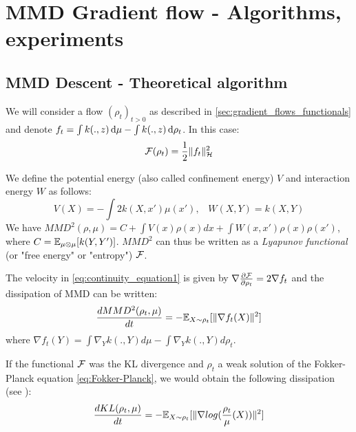 \section{MMD Gradient flow - Algorithms, experiments}\label{sec:mmd_flow}

\subsection{MMD Descent - Theoretical algorithm}

We will consider a flow $(\rho_t)_{t>0}$ as described in \cref{sec:gradient_flows_functionals} and denote $f_t= \int k(.,z)\mathop{}\!\mathrm{d} \mu - \int k(.,z)\mathop{}\!\mathrm{d} \rho_t$. In this case:
\begin{equation}
{{\mathcal F}}(\rho_t)=\frac{1}{2}\|f_t\|^2_{{{\mathcal H}}}
\end{equation} 

We define the potential energy (also called confinement energy) $V$ and interaction energy $W$ as follows:
\begin{equation}
V(X)=-\int 2 k(X,x')\mu(x')\text{,} \quad
W(X,Y)=k(X,Y)
\end{equation}
We have $MMD^2(\rho,\mu)=C+ \int V(x) \rho(x)dx + \int W(x,x')\rho(x)\rho(x')$, where $C={{\mathbb E}}_{\mu\otimes \mu}[k(Y,Y')]$. $MMD^2$ can thus be written as a \textit{Lyapunov functional} (or "free energy" or "entropy") ${{\mathcal F}}$. 


\begin{proposition}\label{prop:mmd_flow}
 The velocity in \eqref{eq:continuity_equation1} is given by $\nabla \frac{\partial{{{\mathcal F}}}}{\partial{\rho_t}}=2 \nabla f_t$ and the dissipation of MMD can be written:  
	\begin{equation}
	\frac{d MMD^2(\rho_t, \mu)}{dt}=-{{\mathbb E}}_{X \sim \rho_t}[\|\nabla f_t(X)\|^2]
	\end{equation}
	where $\nabla f_t(Y)= \int \nabla_{Y}k(.,Y) d\mu -  \int \nabla_{Y}k(.,Y) d\rho_t$.
\end{proposition}

\begin{remark}
	If the functional ${{\mathcal F}}$ was the KL divergence and $\rho_t$ a weak solution of the Fokker-Planck equation \eqref{eq:Fokker-Planck}, we would obtain the following dissipation (see \cite{wibisono2018sampling}):
	\begin{equation}
	\frac{d KL(\rho_t, \mu)}{dt}=-{{\mathbb E}}_{X \sim \rho_t}[\|\nabla log(\frac{\rho_t}{\mu}(X))\|^2]
	\end{equation}
\end{remark}


